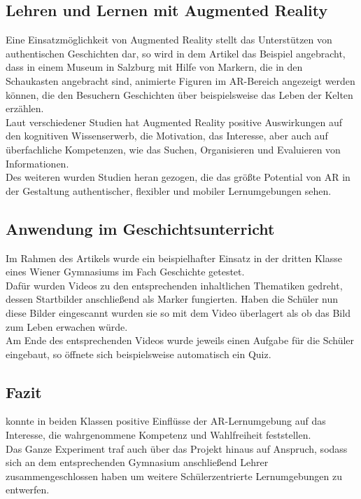 \subsection{Lehren und Lernen mit Augmented Reality}
Eine Einsatzmöglichkeit von Augmented Reality stellt das Unterstützen von authentischen Geschichten dar, so wird in dem Artikel das Beispiel angebracht, dass in einem Museum in Salzburg mit Hilfe von Markern, die in den Schaukasten angebracht sind, animierte Figuren im AR-Bereich angezeigt werden können, die den Besuchern Geschichten über beispielsweise das Leben der Kelten erzählen. \\
Laut verschiedener Studien hat Augmented Reality positive Auswirkungen auf den kognitiven Wissenserwerb, die Motivation, das Interesse, aber auch auf überfachliche Kompetenzen, wie das Suchen, Organisieren und Evaluieren von Informationen. \\
Des weiteren wurden Studien heran gezogen, die das größte Potential von AR in der Gestaltung authentischer, flexibler und mobiler Lernumgebungen sehen. \citep[Kapitel 3]{buchner:ar-geschichtsunterricht}

\subsection{Anwendung im Geschichtsunterricht}
Im Rahmen des Artikels wurde ein beispielhafter Einsatz in der dritten Klasse eines Wiener Gymnasiums im Fach Geschichte getestet.\\
Dafür wurden Videos zu den entsprechenden inhaltlichen Thematiken gedreht, dessen Startbilder anschließend als Marker fungierten. Haben die Schüler nun diese Bilder eingescannt wurden sie so mit dem Video überlagert als ob das Bild zum Leben erwachen würde. \\
Am Ende des entsprechenden Videos wurde jeweils einen Aufgabe für die Schüler eingebaut, so öffnete sich beispielsweise automatisch ein Quiz. \citep[Kapitel 4]{buchner:ar-geschichtsunterricht}

\subsection{Fazit}
\citeauthor{buchner:ar-geschichtsunterricht} konnte in beiden Klassen positive Einflüsse der AR-Lernumgebung auf das Interesse, die wahrgenommene Kompetenz und Wahlfreiheit feststellen.\\
Das Ganze Experiment traf auch über das Projekt hinaus auf Anspruch, sodass sich an dem entsprechenden Gymnasium anschließend Lehrer zusammengeschlossen haben um weitere Schülerzentrierte Lernumgebungen zu entwerfen. \citep[Kapitel 5-6]{buchner:ar-geschichtsunterricht}


